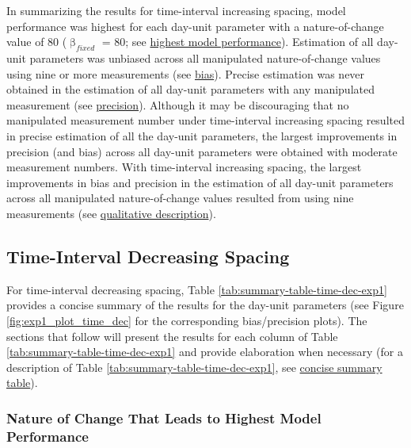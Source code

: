 \documentclass[
12pt, %
twoside,
english]{guelphthesis}
\begin{document}
In summarizing the results for time-interval increasing spacing, model performance was highest for each day-unit parameter with a nature-of-change value of 80 (\(\upbeta_{fixed}\) = 80; see \protect\hyperlink{nature-change-time-inc-exp1}{highest model performance}). Estimation of all day-unit parameters was unbiased across all manipulated nature-of-change values using nine or more measurements (see \protect\hyperlink{bias-time-inc-exp1}{bias}). Precise estimation was never obtained in the estimation of all day-unit parameters with any manipulated measurement (see \protect\hyperlink{precision-time-inc-exp1}{precision}). Although it may be discouraging that no manipulated measurement number under time-interval increasing spacing resulted in precise estimation of all the day-unit parameters, the largest improvements in precision (and bias) across all day-unit parameters were obtained with moderate measurement numbers. With time-interval increasing spacing, the largest improvements in bias and precision in the estimation of all day-unit parameters across all manipulated nature-of-change values resulted from using nine measurements (see \protect\hyperlink{qualitative-time-inc-exp1}{qualitative description}).

\hypertarget{time-interval-decreasing-spacing}{%
\subsection{Time-Interval Decreasing Spacing}\label{time-interval-decreasing-spacing}}

For time-interval decreasing spacing, Table \ref{tab:summary-table-time-dec-exp1} provides a concise summary of the results for the day-unit parameters (see Figure \ref{fig:exp1_plot_time_dec} for the corresponding bias/precision plots). The sections that follow will present the results for each column of Table \ref{tab:summary-table-time-dec-exp1} and provide elaboration when necessary (for a description of Table \ref{tab:summary-table-time-dec-exp1}, see \protect\hyperlink{concise-tab}{concise summary table}).

\hypertarget{nature-change-time-dec-exp1}{%
\subsubsection{Nature of Change That Leads to Highest Model Performance}\label{nature-change-time-dec-exp1}}
\end{document}
